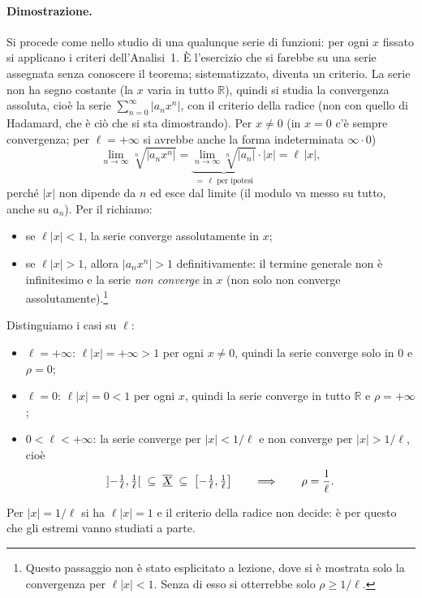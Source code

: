 \paragraph{Dimostrazione.}
Si procede come nello studio di una qualunque serie di funzioni: per ogni $x$
fissato si applicano i criteri dell'Analisi~1. È l'esercizio che si farebbe su
una serie assegnata senza conoscere il teorema; sistematizzato, diventa un
criterio. La serie non ha segno costante (la $x$ varia in tutto $\mathbb{R}$),
quindi si studia la convergenza assoluta, cioè la serie
$\sum_{n=0}^{\infty}|a_nx^n|$, con il criterio della radice (non con quello di
Hadamard, che è ciò che si sta dimostrando).
Per $x\neq0$ (in $x=0$ c'è sempre convergenza; per $\ell=+\infty$ si avrebbe
anche la forma indeterminata $\infty\cdot0$)
\[
  \lim_{n\to\infty}\sqrt[n]{|a_nx^n|}
  =\underbrace{\lim_{n\to\infty}\sqrt[n]{|a_n|}}_{=\,\ell\text{ per ipotesi}}\cdot|x|
  =\ell\,|x| ,
\]
perché $|x|$ non dipende da $n$ ed esce dal limite (il modulo va messo su tutto,
anche su $a_n$). Per il richiamo:
\begin{itemize}
  \item se $\ell|x|<1$, la serie converge assolutamente in $x$;
  \item se $\ell|x|>1$, allora $|a_nx^n|>1$ definitivamente: il termine
  generale non è infinitesimo e la serie \emph{non converge} in $x$ (non solo
  non converge assolutamente).\footnote{Questo passaggio non è stato esplicitato
  a lezione, dove si è mostrata solo la convergenza per $\ell|x|<1$. Senza di
  esso si otterrebbe solo $\rho\ge1/\ell$.}
\end{itemize}
Distinguiamo i casi su $\ell$:
\begin{itemize}
  \item $\ell=+\infty$: $\ell|x|=+\infty>1$ per ogni $x\neq0$, quindi la serie
  converge solo in $0$ e $\rho=0$;
  \item $\ell=0$: $\ell|x|=0<1$ per ogni $x$, quindi la serie converge in tutto
  $\mathbb{R}$ e $\rho=+\infty$;
  \item %
  $0<\ell<+\infty$: la serie converge per $|x|<1/\ell$ e non converge per
  $|x|>1/\ell$, cioè
  \[
    \mathopen{]}-\tfrac1\ell,\tfrac1\ell\mathclose{[}\;\subseteq\; \overline{\underline{X}}\;\subseteq\;
    \bigl[-\tfrac1\ell,\tfrac1\ell\bigr]
    \qquad\Longrightarrow\qquad \rho=\frac{1}{\ell}.
  \]
\end{itemize}
Per $|x|=1/\ell$ si ha $\ell|x|=1$ e il criterio della radice non decide: è per
questo che gli estremi vanno studiati a parte.

